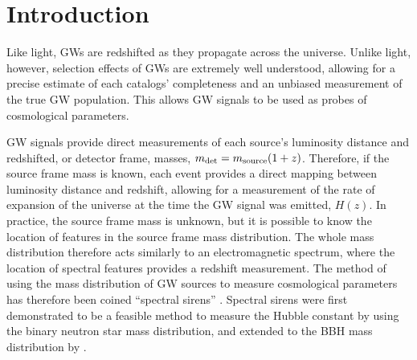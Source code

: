 \documentclass[]{aastex631}
\begin{document}
\section{Introduction}
\label{sec:intro}
Like light, \acp{GW} are redshifted as they propagate across the universe.
Unlike light, however,  selection effects of \acp{GW} are extremely well understood, allowing for a precise estimate of each catalogs' completeness and an unbiased measurement of the true \ac{GW} population. 
This allows \ac{GW} signals to be used as  %
probes of cosmological parameters. 
\citep[e.g.][]{}%

\ac{GW} signals provide direct measurements of each source's luminosity distance  and redshifted, or detector frame, masses, $m_{\det}= m_{\text{source}}(1+z)$.
Therefore, if the source frame mass is known, each event provides a direct mapping between luminosity distance and redshift, allowing for a measurement of the rate of expansion of the universe at the time the \ac{GW} signal was emitted, $H(z)$.
In practice, the source frame mass is unknown, but it is possible to know the location of features in the source frame mass distribution.
The whole mass distribution therefore acts similarly to an electromagnetic spectrum, where the location of spectral features provides a redshift measurement.
The method of using the mass distribution of \ac{GW} sources to measure cosmological parameters has therefore been coined ``spectral sirens'' \citep{ezquiaga_spectral_2022}.
Spectral sirens were first demonstrated to be a feasible method to measure the Hubble constant by \cite{chernoff_gravitational_1993,Taylor:2011fs} using the binary neutron star mass distribution, and extended to the \ac{BBH} mass distribution by \cite{farr_future_2019}. 
\end{document}
